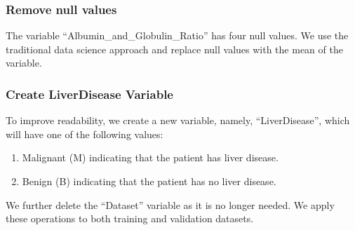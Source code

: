 \documentclass[]{article}
\newenvironment{Shaded}{\begin{snugshade}}{\end{snugshade}}
\newcommand{\CommentTok}[1]{\textcolor[rgb]{0.56,0.35,0.01}{\textit{#1}}}
\newcommand{\DataTypeTok}[1]{\textcolor[rgb]{0.13,0.29,0.53}{#1}}
\newcommand{\KeywordTok}[1]{\textcolor[rgb]{0.13,0.29,0.53}{\textbf{#1}}}
\newcommand{\NormalTok}[1]{#1}
\newcommand{\OperatorTok}[1]{\textcolor[rgb]{0.81,0.36,0.00}{\textbf{#1}}}
\newcommand{\OtherTok}[1]{\textcolor[rgb]{0.56,0.35,0.01}{#1}}
\newcommand{\StringTok}[1]{\textcolor[rgb]{0.31,0.60,0.02}{#1}}
\begin{document}
\subsubsection{Remove null values}

The variable ``Albumin\_and\_Globulin\_Ratio'' has four null values. We
use the traditional data science approach and replace null values with
the mean of the variable.

\begin{Shaded}
\end{Shaded}

\subsubsection{Create LiverDisease Variable}

To improve readability, we create a new variable, namely,
``LiverDisease'', which will have one of the following values:

\begin{enumerate}
\item Malignant (M) indicating that the patient has liver disease.
\item Benign (B) indicating that the patient has no liver disease.
\end{enumerate}

We further delete the ``Dataset'' variable as it is no longer needed. We
apply these operations to both training and validation datasets.
\end{document}
